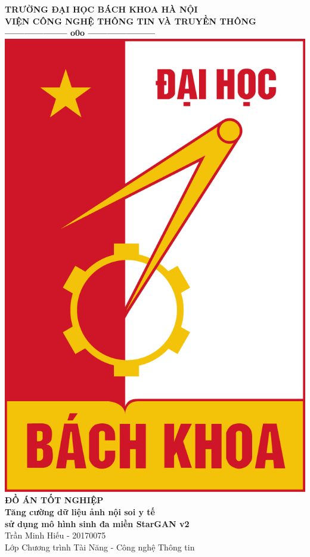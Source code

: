 \documentclass[12pt]{extreport}
\begin{document}
\thispagestyle{empty}
\thisfancypage{
    \setlength{\fboxsep}{0pt}
    \fbox}{}

\begin{center}
    {\fontsize{13pt}{1}\selectfont\textbf{TRƯỜNG ĐẠI HỌC BÁCH KHOA HÀ NỘI}}
    \\
    {\fontsize{13pt}{1}\selectfont\textbf{VIỆN CÔNG NGHỆ THÔNG TIN VÀ TRUYỀN THÔNG}}
    \\
    \textbf{--------------------  o0o  ---------------------}\\[2.5cm]
    \includegraphics[scale=0.3]{bk-rgb.jpg} \\[2.5cm]
    \textbf{\large{ĐỒ ÁN TỐT NGHIỆP}}\\[1cm]
    \textbf{\large{Tăng cường dữ liệu ảnh nội soi y tế\\sử dụng mô hình sinh đa miền StarGAN v2}}\\[1cm]
    Trần Minh Hiếu - 20170075 \\
    Lớp Chương trình Tài Năng - Công nghệ Thông tin
\end{center}
\end{document}
